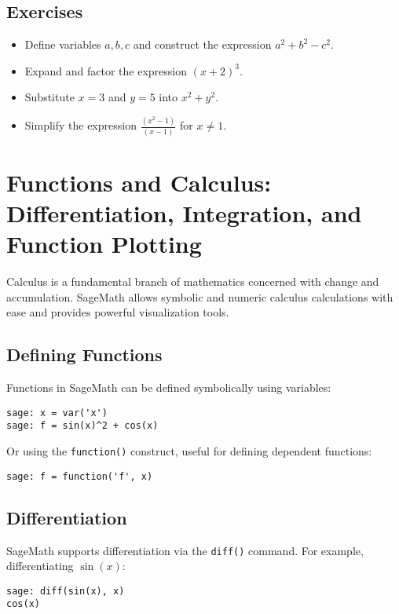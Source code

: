 \documentclass[12pt]{book}
\begin{document}
\section{Exercises}
\begin{itemize}
  \item Define variables \(a, b, c\) and construct the expression \(a^2 + b^2 - c^2\).
  \item Expand and factor the expression \((x + 2)^3\).
  \item Substitute \(x = 3\) and \(y = 5\) into \(x^2 + y^2\).
  \item Simplify the expression \(\frac{(x^2 - 1)}{(x - 1)}\) for \(x \neq 1\).
\end{itemize}

\chapter{Functions and Calculus: Differentiation, Integration, and Function Plotting}

Calculus is a fundamental branch of mathematics concerned with change and accumulation. SageMath allows symbolic and numeric calculus calculations with ease and provides powerful visualization tools.

\section{Defining Functions}

Functions in SageMath can be defined symbolically using variables:

\begin{verbatim}
sage: x = var('x')
sage: f = sin(x)^2 + cos(x)
\end{verbatim}

Or using the \texttt{function()} construct, useful for defining dependent functions:

\begin{verbatim}
sage: f = function('f', x)
\end{verbatim}

\section{Differentiation}

SageMath supports differentiation via the \texttt{diff()} command. For example, differentiating \( \sin(x) \):

\begin{verbatim}
sage: diff(sin(x), x)
cos(x)
\end{verbatim}
\end{document}
